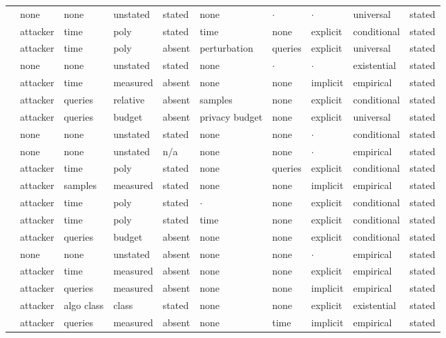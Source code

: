 \begin{landscape}
\begin{longtable}{rlllllllll}
\cite{CHSS24} & none & none & unstated & stated & none & $\cdot$ & $\cdot$ & universal & stated \\
\cite{CKMMNST25} & attacker & time & poly & stated & time & none & explicit & conditional & stated \\
\cite{DN03} & attacker & time & poly & absent & perturbation & queries & explicit & universal & stated \\
\cite{KMNS26} & none & none & unstated & stated & none & $\cdot$ & $\cdot$ & existential & stated \\
\cite{BDJV22} & attacker & time & measured & absent & none & none & implicit & empirical & stated \\
\cite{HU14} & attacker & queries & relative & absent & samples & none & explicit & conditional & stated \\
\cite{ML24} & attacker & queries & budget & absent & privacy budget & none & explicit & universal & stated \\
\cite{BCH22} & none & none & unstated & stated & none & none & $\cdot$ & conditional & stated \\
\cite{WLBZ25} & none & none & unstated & n/a & none & none & $\cdot$ & empirical & stated \\
\cite{HMST22} & attacker & time & poly & stated & none & queries & explicit & conditional & stated \\
\cite{SE22} & attacker & samples & measured & stated & none & none & implicit & empirical & stated \\
\cite{Son24} & attacker & time & poly & stated & $\cdot$ & none & explicit & conditional & stated \\
\cite{XSD24} & attacker & time & poly & stated & time & none & explicit & conditional & stated \\
\cite{CCGJY20} & attacker & queries & budget & absent & none & none & explicit & conditional & stated \\
\cite{SSEP24} & none & none & unstated & absent & none & none & $\cdot$ & empirical & stated \\
\cite{DKLP22} & attacker & time & measured & absent & none & none & explicit & empirical & stated \\
\cite{CJM20} & attacker & queries & measured & absent & none & none & implicit & empirical & stated \\
\cite{JCBKP20} & attacker & algo class & class & stated & none & none & explicit & existential & stated \\
\cite{CCHRSS24} & attacker & queries & measured & absent & none & time & implicit & empirical & stated \\

\end{longtable}
\end{landscape}
